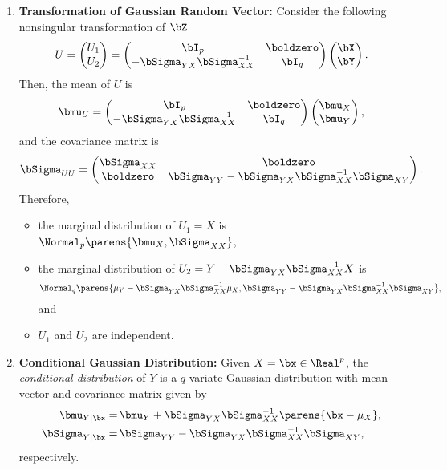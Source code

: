\documentclass[12pt]{article}
\begin{document}
\begin{enumerate}[label=\textbf{\arabic*.}]
	\item \textbf{Transformation of Gaussian Random Vector:} Consider the following nonsingular transformation of $\bZ$
	\begin{align*}
		U = \begin{pmatrix}
			U_1 \\ U_2 
		\end{pmatrix} = 
		\begin{pmatrix}
			\bI_p & \boldzero \\ - \bSigma_{YX} \bSigma_{XX}^{-1} & \bI_q
		\end{pmatrix} \begin{pmatrix}
			\bX \\ \bY
		\end{pmatrix}. 
	\end{align*}
	Then, the mean of $U$ is 
	\begin{align*}
		\bmu_{U} = 
		\begin{pmatrix}
			\bI_p & \boldzero \\ - \bSigma_{YX} \bSigma_{XX}^{-1} & \bI_q
		\end{pmatrix} \begin{pmatrix}
			\bmu_X \\ \bmu_Y
		\end{pmatrix}, 
	\end{align*}
	and the covariance matrix is
	\begin{align*}
		\bSigma_{UU} = 
		\begin{pmatrix}
			\bSigma_{XX} & \boldzero \\ \boldzero & \bSigma_{YY} - \bSigma_{YX}\bSigma_{XX}^{-1} \bSigma_{XY}
		\end{pmatrix}. 
	\end{align*}
	Therefore, 
	\begin{itemize}
		\item the marginal distribution of $U_1 = X$ is $\Normal_p \parens{\bmu_X, \bSigma_{XX}}$, 
		\item the marginal distribution of $U_2 = Y - \bSigma_{YX} \bSigma_{XX}^{-1} X$ is $$\Normal_q \parens{\mu_Y - \bSigma_{YX} \bSigma_{XX}^{-1} \mu_X, \bSigma_{YY} - \bSigma_{YX}\bSigma_{XX}^{-1} \bSigma_{XY}},$$ and 
		\item $U_1$ and $U_2$ are independent. 
	\end{itemize}
	
	\item \textbf{Conditional Gaussian Distribution:} Given $X = \bx \in \Real^p$, the \textit{conditional distribution} of $Y$ is a $q$-variate Gaussian distribution with mean vector and covariance matrix given by
	\begin{align*}
		\bmu_{Y \mid \bx} = & \, \bmu_{Y} + \bSigma_{YX} \bSigma^{-1}_{XX} \parens{\bx - \mu_{X}}, \\
		\bSigma_{Y \mid \bx} = & \, \bSigma_{YY} - \bSigma_{YX} \bSigma_{XX}^{-1} \bSigma_{XY}, 
	\end{align*}
	respectively.  

\end{enumerate}
\end{document}
